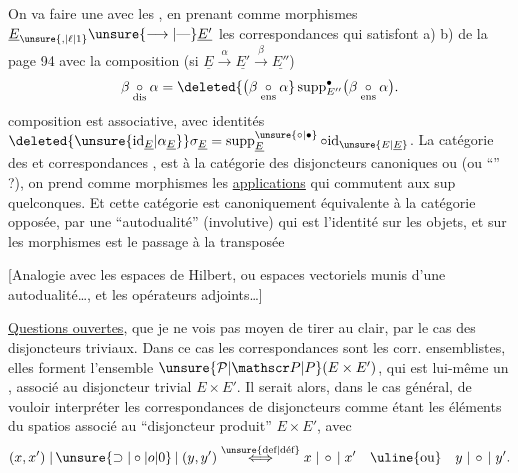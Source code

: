 On va faire une \uline{} avec les , en prenant comme morphismes $\underline E_{\unsure{,|\ell|1}}\unsure{\longrightarrow|\mbox{---}}\underline{E'}$ les correspondances qui satisfont a) b) de la page 94 avec la composition (si $\underline E\xrightarrow{\alpha}\underline{E'}\xrightarrow{\beta}\underline{E''}$)
\[
 \beta\underset{\mathrm{dis}}{\circ}\alpha=
 \deleted{\bigl(\beta\underset{\mathrm{ens}}{\circ}\alpha}
 \operatorname{supp}_{E''}^{\bullet}\bigl(\beta\underset{\mathrm{ens}}{\circ}\alpha\bigr).
\]
composition est associative, avec  identités $\deleted{\unsure{\mathrm{id}_{\underline E}|\alpha_{\underline E}}}\sigma_{\underline E}=\operatorname{supp}^{\unsure{\circ|\bullet}}_{\underline E}\circ\mathrm{id}_{\unsure{E|\underline E}}$. La catégorie des  et correspondances  , est  à la catégorie des disjoncteurs canoniques ou  (ou ``\uline{}'' ?),  on prend comme morphismes les \uline{applications}  qui commutent aux sup quelconques. Et cette catégorie est canoniquement équivalente à la catégorie opposée, par une ``autodualité'' (involutive) qui est l'identité sur les objets, et sur les morphismes est le passage à la  transposée

[Analogie avec les espaces de Hilbert, ou  espaces vectoriels munis d'une autodualité\ldots, et les opérateurs adjoints\ldots]

\uline{Questions ouvertes}, que je ne vois pas moyen de tirer au clair,  par le cas des disjoncteurs triviaux.
Dans ce cas les correspondances   sont les corr. ensemblistes, elles forment l'ensemble $\unsure{\mathcal P|\mathscr P|P}(E\times E')$, qui est lui-même un  , associé au disjoncteur trivial $E\times E'$. Il serait  alors, dans le cas général, de vouloir interpréter les correspondances de disjoncteurs  comme étant les éléments du spatios associé au ``disjoncteur produit'' $E\times E'$, avec
\[
 (x,x')\mathrel{|\,\unsure{\supset|\circ|o|0}\,|}(y,y')
 \overset{\text{\unsure{def|déf}}}{\Longleftrightarrow}
 x\mathrel{|\,\circ\,|}x'\quad\text{\uline{ou}}\quad y\mathrel{|\,\circ\,|}y'.
\]

